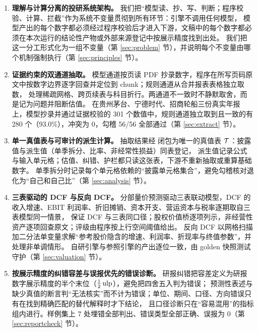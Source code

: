 \begin{enumerate}[label=\textbf{C\arabic*}, leftmargin=2.2em]
  \item \textbf{理解与计算分离的投研系统架构。}
    我们把“模型读、抄、写、判断；程序校验、计算、拦截”作为系统不变量贯彻到所有环节：引擎不调用任何模型，
    模型产出的每个数字都必须经过程序校验后才进入下游，文稿中的每个数字都必须在本次运行的结论性产物或外部来源登记中按展示精度找到出处。
    我们把这一分工形式化为一组不变量（第 \ref{sec:problem} 节），并说明每个不变量由哪个机制强制执行（第 \ref{sec:principles} 节）。

  \item \textbf{证据约束的双通道抽取。}
    模型通道按页读 PDF 抄录数字，程序在所写页码原文中按数字边界逐字回查并定位到 chunk；规则通道从合并报表表格独立取数，
    处理稀疏网格、跨页续表与科目折行。两通道不一致时不静默取舍，而是记为问题并阻断估值。
    在贵州茅台、宁德时代、招商轮船三份真实年报上，模型抄录并通过证据校验的 301 个数值中，规则通道独立取到且一致的有 280 个（93.0\%），冲突为 0，勾稽 56/56 全部通过（第 \ref{sec:extract} 节）。

  \item \textbf{单一真值表与可审计的派生计算。}
    抽取结果经  闭包为唯一的真值表 $\mathcal{T}$：披露值与派生值（单季拆分、比率、非经常性损益）同表登记，
    派生值记录公式与输入单元格；估值、纠错、护栏都只读这张表，下游不重新抽取或重算基础数字。
    单季拆分时记录每个单元格依赖的“披露单元格集合”，避免勾稽核对退化为“自己和自己比”（第 \ref{sec:analysis} 节）。

  \item \textbf{三表驱动的 DCF 与反向 DCF。}
    分部量价预测驱动三表联动模型，DCF 的收入增速、EBIT 利润率、折旧摊销、资本开支、营运资本与税率逐期取自三表模型同一情景，
    保证 DCF 与三表同口径；股权价值桥逐项列示，非经营性资产逐项回查原文；评级由程序按上行空间阈值给出。
    反向 DCF 以网格扫描加二分法单变量求解“参考股价隐含的增速、利润率、折现率与终值参数”，并处理非单调情形。
    自研引擎与参照引擎的产出逐位一致，由 golden 快照测试守护（第 \ref{sec:valuation} 节）。

  \item \textbf{按展示精度的纠错容差与误报优先的错误诊断。}
    研报纠错把容差定义为研报数字展示精度的半个末位（$\tfrac12\operatorname{ulp}$），避免把四舍五入判为错误；
    预测性表述与缺少真值的断言判“无法核实”而不计为错误；单位、期间、口径、方向错误只有在找到精确匹配的替代解释时才下结论，
    且口径诊断只在“容易混用”的指标组内进行。样例集上 7 处埋错全部判出、错误类型全部正确、误报为 0（第 \ref{sec:reportcheck} 节）。


\end{enumerate}
